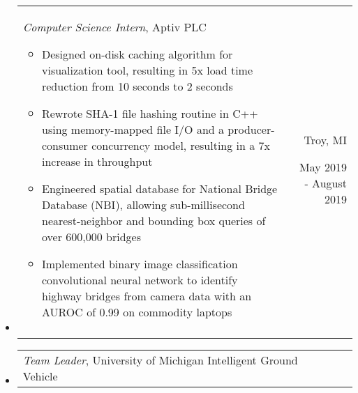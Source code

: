 \documentclass[9pt]{memoir}
\begin{document}
\begin{itemize}

\item

\begin{tabular}[t]{lr}

\begin{minipage}[t]{0.7 \textwidth}
\raggedright

\normalsize
\textit{Computer Science Intern}, Aptiv PLC

\small

\begin{itemize}
    \item Designed on-disk caching algorithm for visualization tool, resulting
          in 5x load time reduction from 10 seconds to 2 seconds
    \item Rewrote SHA-1 file hashing routine in C++ using memory-mapped file
          I/O and a producer-consumer concurrency model, resulting in a 7x
          increase in throughput
    \item Engineered spatial database for National Bridge Database (NBI),
          allowing sub-millisecond nearest-neighbor and bounding box queries of
          over 600,000 bridges
    \item Implemented binary image classification convolutional neural network
          to identify highway bridges from camera data with an AUROC of 0.99 on
          commodity laptops
\end{itemize}

\end{minipage}

&

\begin{minipage}[t]{0.2 \textwidth}
\raggedleft

\normalsize
Troy, MI

\small
May 2019 - August 2019
\end{minipage}

\\ \\

\end{tabular}

\item

\begin{tabular}[t]{lr}

\begin{minipage}[t]{0.7 \textwidth}
\raggedright

\normalsize
\textit{Team Leader}, University of Michigan Intelligent Ground Vehicle


\end{minipage}
\end{tabular}
\end{itemize}
\end{document}
